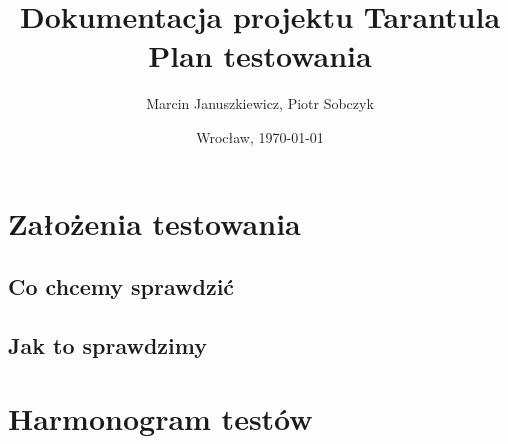 \documentclass[11pt,leqno]{article}
\title{\LARGE Dokumentacja projektu \textbf{Tarantula}\\
							Plan testowania}
\author{Marcin Januszkiewicz, Piotr Sobczyk}
\date{Wrocław, \today}
\begin{document}
\maketitle 
\thispagestyle{empty}
\newpage
\tableofcontents
\newpage

\section{Założenia testowania}
\subsection{Co chcemy sprawdzić}


\subsection{Jak to sprawdzimy}

\section{Harmonogram testów}
\end{document}
